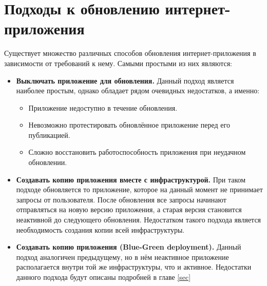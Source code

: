 \section{Подходы к обновлению интернет-приложе\-ния}
Существует множество различных способов обновления интернет-прило\-же\-ния в зависимости от требований к нему. Самыми простыми из них являются:
\begin{itemize}
	\item {\bf Выключать приложение для обновления.} Данный подход является наиболее простым, однако обладает рядом очевидных недостатков, а именно:
	\begin{itemize}
		\item Приложение недоступно в течение обновления.
		\item Невозможно протестировать обновлённое приложение перед его публикацией.
		\item Сложно восстановить работоспособность приложения при неудачном обновлении.
	\end{itemize}
	\item {\bf Создавать копию приложения вместе с инфраструктурой.} При таком подходе обновляется то приложение, которое на данный момент не принимает запросы от пользователя. После обновления все запросы начинают отправляться на новую версию приложения, а старая версия становится неактивной до следующего обновления. Недостатком такого подхода является необходимость создания копии всей инфраструктуры.
	\item {\bf Создавать копию приложения (Blue-Green deployment).} Данный подход аналогичен предыдущему, но в нём неактивное приложение располагается внутри той же инфраструктуры, что и активное. Недостатки данного подхода будут описаны подробней в главе \ref{sec}
\end{itemize}